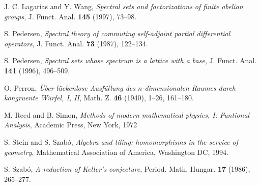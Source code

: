 \documentclass[12pt]{amsart}
\theoremstyle{plain}
\numberwithin{equation}{section}
\begin{document}
\begin{thebibliography}{ABCD}
   J. C. Lagarias and Y. Wang,
   \emph{Spectral sets and factorizations of finite abelian groups},
   J. Funct. Anal. \textbf{145} (1997), 73--98.

   S. Pedersen,
   \emph{Spectral theory of commuting self-adjoint partial
   differential operators},
   J. Funct. Anal. \textbf{73} (1987), 122--134.
 
   S. Pedersen,
   \emph{Spectral sets whose spectrum is a lattice with a base},
   J. Funct. Anal. \textbf{141} (1996), 496--509.

   O. Perron,
   \emph{\"Uber l\"uckenlose Ausf\"ullung des $n$-dimensionalen
      Raumes durch kongruente W\"urfel{\rm , I, II}},
   Math. Z. \textbf{46} (1940), 1--26, 161--180.

   M. Reed and B. Simon,
   \emph{Methods of modern mathematical physics,
   I: Funtional Analysis},
   Academic Press, New York, 1972

   S. Stein and S. Szab\'o,
   \emph{Algebra and tiling: homomorphisms in the service of
   geometry},
   Mathematical Association of America, Washington DC, 1994.

   S. Szab\'o,
   \emph{A reduction of Keller{\rm '}s conjecture},
   Period. Math. Hungar. \textbf{17} (1986), 265--277.

\end{thebibliography}
\end{document}
